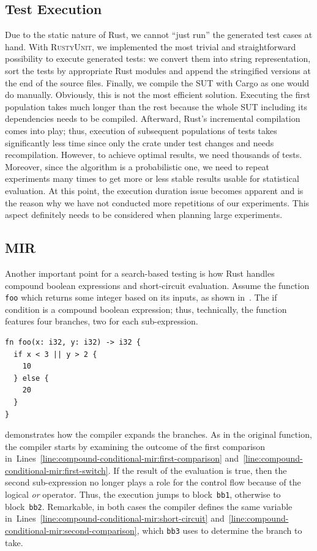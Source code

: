 \documentclass[paper=a4,%
  twoside,%
  BCOR4mm,%
  abstract=true,%
  toc=bibliography,%
  chapterprefix=true,%
  toc=bibliographynumbered,%
  open=right,%
  english,%
  pagesize=pdftex]{scrreprt}
\newcommand{\tech}{\textsc{RustyUnit}\xspace}
\newcommand{\sut}{\ac{SUT}\xspace}
\begin{document}
\subsection*{Test Execution}
Due to the static nature of Rust, we cannot ``just run'' the generated test cases at hand. With \tech, we implemented the most trivial and straightforward possibility to execute generated tests: we convert them into string representation, sort the tests by appropriate Rust modules and append the stringified versions at the end of the source files. Finally, we compile the \sut with Cargo as one would do manually. Obviously, this is not the most efficient solution. Executing the first population takes much longer than the rest because the whole \sut including its dependencies needs to be compiled. Afterward, Rust's incremental compilation comes into play; thus, execution of subsequent populations of tests takes significantly less time since only the crate under test changes and needs recompilation. However, to achieve optimal results, we need thousands of tests. Moreover, since the algorithm is a probabilistic one, we need to repeat experiments many times to get more or less stable results usable for statistical evaluation. At this point, the execution duration issue becomes apparent and is the reason why we have not conducted more repetitions of our experiments. This aspect definitely needs to be considered when planning large experiments.

\subsection*{MIR}
Another important point for a search-based testing is how Rust handles compound boolean expressions and short-circuit evaluation. Assume the function \texttt{foo} which returns some integer based on its inputs, as shown in~. The if condition is a compound boolean expression; thus, technically, the function features four branches, two for each sub-expression.
\begin{lstlisting}[style=boxed, caption={A function with a compound conditional expression}, label=lst:compound-conditional-example]
fn foo(x: i32, y: i32) -> i32 {
  if x < 3 || y > 2 {
    10
  } else {
    20
  }
}
\end{lstlisting}

 demonstrates how the compiler expands the branches. As in the original function, the compiler starts by examining the outcome of the first comparison in~Lines~\ref{line:compound-conditional-mir:first-comparison} and~\ref{line:compound-conditional-mir:first-switch}. If the result of the evaluation is true, then the second sub-expression no longer plays a role for the control flow because of the logical \emph{or} operator. Thus, the execution jumps to block~\texttt{bb1}, otherwise to block~\texttt{bb2}. Remarkable, in both cases the compiler defines the same variable in~Lines~\ref{line:compound-conditional-mir:short-circuit} and~\ref{line:compound-conditional-mir:second-comparison}, which \texttt{bb3} uses to determine the branch to take.
\end{document}
